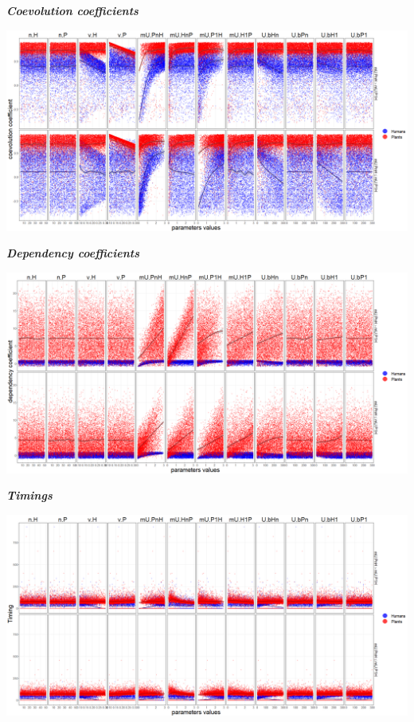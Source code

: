 \documentclass[]{book}
\begin{document}
\textbf{\emph{Coevolution coefficients}}

\includegraphics[width=1\linewidth]{plots/5_multiplePar-coevo-plantImprove-ggplot}

\textbf{\emph{Dependency coefficients}}

\includegraphics[width=1\linewidth]{plots/5_multiplePar-depend-plantImprove-ggplot}

\textbf{\emph{Timings}}

\includegraphics[width=1\linewidth]{plots/5_multiplePar-timing-plantImprove-ggplot}

\newpage
\end{document}

